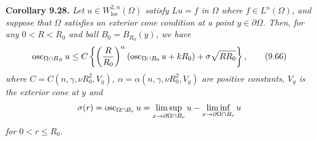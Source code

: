 \noindent\textbf{Corollary 9.28.} \textit{Let $u\in W^{2,n}_{\mathrm{loc}}(\Omega)$ satisfy $Lu=f$ in $\Omega$ where $f\in L^n(\Omega)$, and suppose that $\Omega$ satisfies an exterior cone condition at a point $y\in\partial\Omega$. Then, for any $0<R<R_0$ and ball $B_0=B_{R_0}(y)$, we have}
\begin{equation}
\operatorname{osc}_{\Omega\cap B_R}u
\le
C\left\{\left(\frac{R}{R_0}\right)^{\alpha}\left(\operatorname{osc}_{\Omega\cap B_0}u+kR_0\right)+\sigma\sqrt{RR_0}\right\},
\tag{9.66}
\end{equation}
\textit{where $C=C(n,\gamma,\nu R_0^2,V_y)$, $\alpha=\alpha(n,\gamma,\nu R_0^2,V_y)$ are positive constants, $V_y$ is the exterior cone at $y$ and}
\[
\sigma(r)=\operatorname{osc}_{\Omega\cap B_r}u=\limsup_{x\to\partial\Omega\cap B_r}u-\liminf_{x\to\partial\Omega\cap B_r}u
\]
\textit{for $0<r\le R_0$.}


\providecommand{\loc}{\mathrm{loc}}

